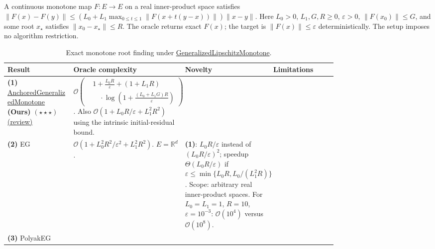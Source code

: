 \begin{table}[tp]
\centering
\caption{Exact monotone root finding under \href{https://github.com/k3nfalt/longtails/blob/main/LongTails/Setups/GeneralizedLipschitzMonotone.lean}{GeneralizedLipschitzMonotone}.}\label{tab:GeneralizedLipschitzMonotone}
\parbox{\linewidth}{\footnotesize A continuous monotone map $F:E\to E$ on a real inner-product space satisfies
$\|F(x)-F(y)\|\le (L_0+L_1\max_{0\le t\le1}\|F(x+t(y-x))\|)\|x-y\|$.
Here $L_0>0$, $L_1,G,R\ge0$, $\varepsilon>0$, $\|F(x_0)\|\le G$, and some root $x_\star$ satisfies $\|x_0-x_\star\|\le R$. The oracle returns exact $F(x)$; the target is $\|F(x)\|\le\varepsilon$ deterministically. The setup imposes no algorithm restriction.}\par\smallskip
\begin{threeparttable}
\footnotesize
\setlength{\tabcolsep}{4pt}\renewcommand{\arraystretch}{1.25}
\begin{tabularx}{\linewidth}{@{}>{\raggedright\arraybackslash}p{0.20\linewidth}>{\raggedright\arraybackslash}p{0.32\linewidth}>{\raggedright\arraybackslash}p{0.25\linewidth}>{\raggedright\arraybackslash}X@{}}
\toprule
\textbf{Result} & \textbf{Oracle complexity} & \textbf{Novelty} & \textbf{Limitations} \\
\midrule
\textbf{(1)} \href{https://github.com/k3nfalt/longtails/blob/main/LongTails/Theorems/AnchoredGeneralizedMonotone.lean}{Anchored\allowbreak Generalized\allowbreak Monotone} \textbf{(Ours)} $(\star\star\star)$ \href{https://github.com/k3nfalt/longtails/blob/main/scripts/reviews/AnchoredGeneralizedMonotone.md}{(review)}
& $\mathcal{O}\!\left(\begin{aligned}&1+\frac{L_0R}{\varepsilon}+(1+L_1R)\\[-2pt]&\quad\cdot\log\!\left(1+\frac{(L_0+L_1G)R}{\varepsilon}\right)\end{aligned}\right)$.
Also $\mathcal{O}(1+L_0R/\varepsilon+L_1^2R^2)$ using the intrinsic initial-residual bound.
& & \\
\midrule[1.2pt]
\textbf{(2)} EG \citep[Thm.~3.6]{glmChoudhuryLoizou2025v1}
& $\mathcal{O}(1+L_0^2R^2/\varepsilon^2+L_1^2R^2)$.
$E=\mathbb{R}^d$.
& \textbf{(1)}: $L_0R/\varepsilon$ instead of $(L_0R/\varepsilon)^2$; speedup $\Theta(L_0R/\varepsilon)$ if $\varepsilon\le\min\{L_0R,L_0/(L_1^2R)\}$. Scope: arbitrary real inner-product spaces. For $L_0=L_1=1$, $R=10$, $\varepsilon=10^{-3}$: $\mathcal{O}(10^4)$ versus $\mathcal{O}(10^8)$.
& \\
\midrule
\textbf{(3)} PolyakEG \citep[Thm.~3.4, Eq.~(19)]{glmYoonEtAl2026v1}

\end{tabularx}
\end{threeparttable}
\end{table}
